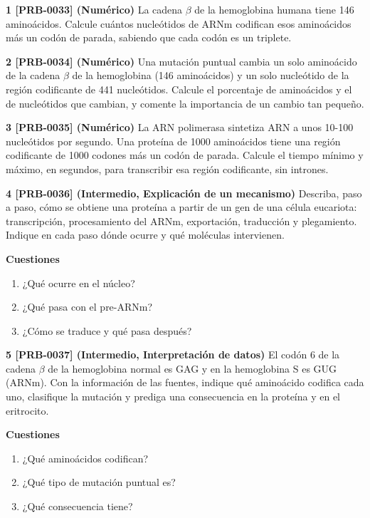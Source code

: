 \documentclass{book}
\begin{document}
\begin{tcolorbox}[title={Ejercicios}, studiumworked, breakable]

\noindent\textbf{1 [PRB-0033] (Numérico)}
La cadena \(\beta\) de la hemoglobina humana tiene 146 aminoácidos. Calcule cuántos nucleótidos de ARNm codifican esos aminoácidos más un codón de parada, sabiendo que cada codón es un triplete.


\noindent\textbf{2 [PRB-0034] (Numérico)}
Una mutación puntual cambia un solo aminoácido de la cadena \(\beta\) de la hemoglobina (146 aminoácidos) y un solo nucleótido de la región codificante de 441 nucleótidos. Calcule el porcentaje de aminoácidos y el de nucleótidos que cambian, y comente la importancia de un cambio tan pequeño.


\noindent\textbf{3 [PRB-0035] (Numérico)}
La ARN polimerasa sintetiza ARN a unos 10-100 nucleótidos por segundo. Una proteína de 1000 aminoácidos tiene una región codificante de 1000 codones más un codón de parada. Calcule el tiempo mínimo y máximo, en segundos, para transcribir esa región codificante, sin intrones.


\noindent\textbf{4 [PRB-0036] (Intermedio, Explicación de un mecanismo)}
Describa, paso a paso, cómo se obtiene una proteína a partir de un gen de una célula eucariota: transcripción, procesamiento del ARNm, exportación, traducción y plegamiento. Indique en cada paso dónde ocurre y qué moléculas intervienen.


\noindent\textbf{Cuestiones}
\begin{enumerate}
\item ¿Qué ocurre en el núcleo?
\item ¿Qué pasa con el pre-ARNm?
\item ¿Cómo se traduce y qué pasa después?
\end{enumerate}

\noindent\textbf{5 [PRB-0037] (Intermedio, Interpretación de datos)}
El codón 6 de la cadena \(\beta\) de la hemoglobina normal es GAG y en la hemoglobina S es GUG (ARNm). Con la información de las fuentes, indique qué aminoácido codifica cada uno, clasifique la mutación y prediga una consecuencia en la proteína y en el eritrocito.


\noindent\textbf{Cuestiones}
\begin{enumerate}
\item ¿Qué aminoácidos codifican?
\item ¿Qué tipo de mutación puntual es?
\item ¿Qué consecuencia tiene?
\end{enumerate}


\end{tcolorbox}
\end{document}
